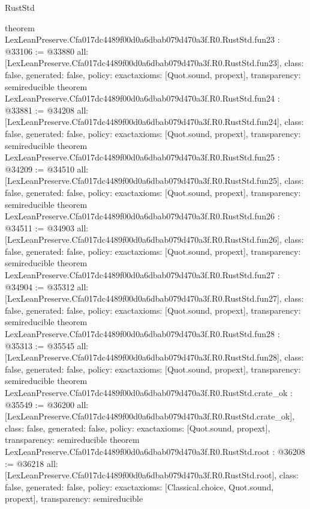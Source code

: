 \begin{lexlean}{RustStd}
\begin{coremodule}
{}
theorem LexLeanPreserve.Cfa017dc4489f00d0a6dbab079d470a3f.R0.RustStd.fun23 : @33106 := @33880 {
  all: [LexLeanPreserve.Cfa017dc4489f00d0a6dbab079d470a3f.R0.RustStd.fun23],
  class: false,
  generated: false,
  policy: exact{axioms: [Quot.sound, propext]},
  transparency: semireducible
}
theorem LexLeanPreserve.Cfa017dc4489f00d0a6dbab079d470a3f.R0.RustStd.fun24 : @33881 := @34208 {
  all: [LexLeanPreserve.Cfa017dc4489f00d0a6dbab079d470a3f.R0.RustStd.fun24],
  class: false,
  generated: false,
  policy: exact{axioms: [Quot.sound, propext]},
  transparency: semireducible
}
theorem LexLeanPreserve.Cfa017dc4489f00d0a6dbab079d470a3f.R0.RustStd.fun25 : @34209 := @34510 {
  all: [LexLeanPreserve.Cfa017dc4489f00d0a6dbab079d470a3f.R0.RustStd.fun25],
  class: false,
  generated: false,
  policy: exact{axioms: [Quot.sound, propext]},
  transparency: semireducible
}
theorem LexLeanPreserve.Cfa017dc4489f00d0a6dbab079d470a3f.R0.RustStd.fun26 : @34511 := @34903 {
  all: [LexLeanPreserve.Cfa017dc4489f00d0a6dbab079d470a3f.R0.RustStd.fun26],
  class: false,
  generated: false,
  policy: exact{axioms: [Quot.sound, propext]},
  transparency: semireducible
}
theorem LexLeanPreserve.Cfa017dc4489f00d0a6dbab079d470a3f.R0.RustStd.fun27 : @34904 := @35312 {
  all: [LexLeanPreserve.Cfa017dc4489f00d0a6dbab079d470a3f.R0.RustStd.fun27],
  class: false,
  generated: false,
  policy: exact{axioms: [Quot.sound, propext]},
  transparency: semireducible
}
theorem LexLeanPreserve.Cfa017dc4489f00d0a6dbab079d470a3f.R0.RustStd.fun28 : @35313 := @35545 {
  all: [LexLeanPreserve.Cfa017dc4489f00d0a6dbab079d470a3f.R0.RustStd.fun28],
  class: false,
  generated: false,
  policy: exact{axioms: [Quot.sound, propext]},
  transparency: semireducible
}
theorem LexLeanPreserve.Cfa017dc4489f00d0a6dbab079d470a3f.R0.RustStd.crate_ok : @35549 := @36200 {
  all: [LexLeanPreserve.Cfa017dc4489f00d0a6dbab079d470a3f.R0.RustStd.crate_ok],
  class: false,
  generated: false,
  policy: exact{axioms: [Quot.sound, propext]},
  transparency: semireducible
}
theorem LexLeanPreserve.Cfa017dc4489f00d0a6dbab079d470a3f.R0.RustStd.root : @36208 := @36218 {
  all: [LexLeanPreserve.Cfa017dc4489f00d0a6dbab079d470a3f.R0.RustStd.root],
  class: false,
  generated: false,
  policy: exact{axioms: [Classical.choice, Quot.sound, propext]},
  transparency: semireducible
}


\end{coremodule}
\end{lexlean}
